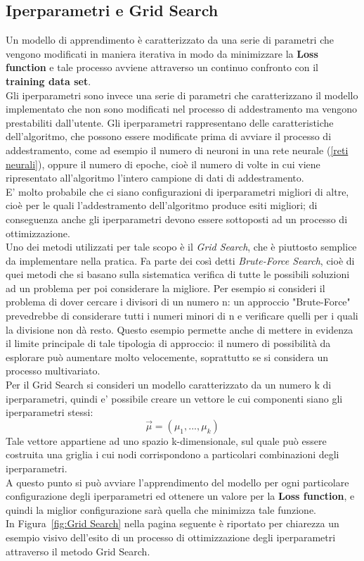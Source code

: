 \subsection{Iperparametri e Grid Search}
\label{iperparametri e grid search}

Un modello di apprendimento è caratterizzato da una serie di parametri che vengono modificati in maniera iterativa in modo da minimizzare la \textbf{Loss function} e tale processo avviene attraverso un continuo confronto con il \textbf{training data set}.\\ 
Gli iperparametri sono invece una serie di parametri che caratterizzano il modello implementato che non sono modificati nel processo di addestramento ma vengono prestabiliti dall'utente. Gli iperparametri rappresentano delle caratteristiche dell'algoritmo, che possono essere modificate prima di avviare il processo di addestramento, come ad esempio il numero di neuroni in una rete neurale (\ref{reti neurali}), oppure il numero di epoche, cioè il numero di volte in cui viene ripresentato all'algoritmo l'intero campione di dati di addestramento.\\
E' molto probabile che ci siano configurazioni di iperparametri migliori di altre, cioè per le quali l'addestramento dell'algoritmo produce esiti migliori; di conseguenza anche gli iperparametri devono essere sottoposti ad un processo di ottimizzazione. \\
Uno dei metodi utilizzati per tale scopo è il \textit{Grid Search}, che è piuttosto semplice da implementare nella pratica. Fa parte dei così detti \textit{Brute-Force Search}, cioè di quei metodi che si basano sulla sistematica verifica di tutte le possibili soluzioni ad un problema per poi considerare la migliore. Per esempio si consideri il problema di dover cercare i divisori di un numero n: un approccio "Brute-Force" prevedrebbe di considerare tutti i numeri minori di n e verificare quelli per i quali la divisione non dà resto. Questo esempio permette anche di mettere in evidenza il limite principale di tale tipologia di approccio: il numero di possibilità da esplorare può aumentare molto velocemente, soprattutto se si considera un processo multivariato. \\
Per il Grid Search si consideri un modello caratterizzato da un numero k di iperparametri, quindi e' possibile creare un vettore le cui componenti siano gli iperparametri stessi:
\begin{equation}
\vec{\mu} = (\mu_1,...,\mu_k)
\end{equation}
Tale vettore appartiene ad uno spazio k-dimensionale, sul quale può essere costruita una griglia i cui nodi corrispondono a particolari combinazioni degli iperparametri. \\
A questo punto si può avviare l'apprendimento del modello per ogni particolare configurazione degli iperparametri ed ottenere un valore per la \textbf{Loss function}, e quindi la miglior configurazione sarà quella che minimizza tale funzione. \\
In Figura~\ref{fig:Grid Search} nella pagina seguente è riportato per chiarezza un esempio visivo dell'esito di un processo di ottimizzazione degli iperparametri attraverso il metodo Grid Search.

